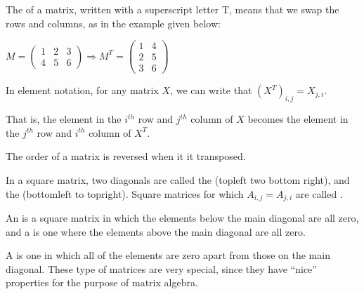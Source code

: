 \documentclass[letterpaper,10pt,english]{jupyterBook}
\begin{document}
\sphinxAtStartPar
The  of a matrix, written with a superscript letter T, means that we swap the rows and columns, as in the example given below:

\sphinxAtStartPar
\( M = \left( \begin{matrix} 1 &2 &3 \\ 4& 5& 6\end{matrix} \right) \Rightarrow M^T = \left( \begin{matrix} 1 & 4 \\ 2 & 5  \\ 3 & 6\end{matrix} \right)\)

\sphinxAtStartPar
In element notation, for any matrix \(X\), we can write that \(\left(X^T\right)_{i,j} = X_{j,i}\).

\sphinxAtStartPar
That is, the element in the \(i^{th}\) row and \(j^{th}\) column of \(X\) becomes the element in the \(j^{th}\) row and \(i^{th}\) column of \(X^T\).

\sphinxAtStartPar
The order of a matrix is reversed when it it transposed.

\sphinxAtStartPar
In a square matrix, two diagonals are called the  (top\sphinxhyphen{}left two bottom right), and the  (bottom\sphinxhyphen{}left to top\sphinxhyphen{}right). Square matrices for which \(A_{i,j}=A_{j,i}\) are called .

\sphinxAtStartPar
An  is a square matrix in which the elements below the main diagonal are all zero, and a  is one where the elements above the main diagonal are all zero.

\sphinxAtStartPar
A  is one in which all of the elements are zero apart from those on the main diagonal. These type of matrices are very special, since they have “nice” properties for the purpose of matrix algebra.
 \label{exercise:q_matrix_definitions}
\end{document}

